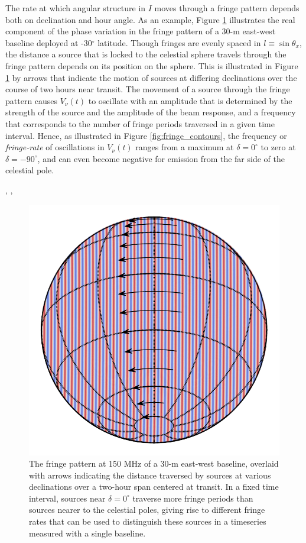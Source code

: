 \documentclass[twocolumn,apj,numberedappendix]{emulateapj}
\begin{document}
The rate at which angular structure in $I$ moves through a fringe pattern depends both on declination
and hour angle.  As an example, Figure \ref{fig:ew_fringe} illustrates the real component of the phase
variation in the fringe pattern of a 30-m east-west baseline deployed at -30$^\circ$ latitude.
Though fringes are evenly spaced in $l\equiv\sin\theta_x$, the distance a source that is locked to the celestial
sphere travels through the fringe pattern depends on its position on the sphere. This is illustrated in Figure
\ref{fig:ew_fringe} by arrows that indicate the motion of sources at differing declinations over the course
of two hours near transit.  The movement of a source through the fringe pattern causes $V_\nu(t)$ to oscillate
with an amplitude that is determined by the strength of the source and the amplitude of the beam response,
and a frequency that corresponds to the number of fringe periods traversed in a given time interval.  Hence,
as illustrated in Figure \ref{fig:fringe_contours}, the frequency or {\it fringe-rate} of oscillations in $V_\nu(t)$
ranges from a maximum at $\delta=0^\circ$ to zero at $\delta=-90^\circ$, and can even become negative
for emission from the far side of the celestial pole.






\citep{parsons_backer2009}, \citep{shaw_et_al2013}, 

\begin{figure}
\includegraphics[width=.9\columnwidth]{plots/ew_fringe}
\caption{
The fringe pattern at 150 MHz of a 30-m east-west baseline, overlaid with arrows indicating
the distance traversed by sources at various declinations over a two-hour span centered at transit.
In a fixed time interval, sources near $\delta=0^\circ$ traverse more 
fringe periods than sources nearer to the celestial poles, giving rise to different
fringe rates that can be used to distinguish these sources in a timeseries measured with a single baseline.
}\label{fig:ew_fringe}
\end{figure}
\end{document}
